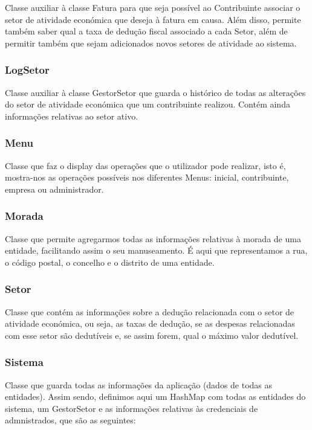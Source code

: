 \documentclass[a4paper]{article}
\begin{document}
Classe auxiliar à classe Fatura para que seja possível ao Contribuinte associar o setor de atividade económica que deseja à fatura em causa. Além disso, permite também saber qual a taxa de dedução fiscal associado a cada Setor, além de permitir também que sejam adicionados novos setores de atividade ao sistema.


\subsubsection{LogSetor} %

Classe auxiliar à classe GestorSetor que guarda o histórico de todas as alterações do setor de atividade económica que um contribuinte realizou. Contém ainda informações relativas ao setor ativo.

 
\subsubsection{Menu} %

Classe que faz o display das operações que o utilizador pode realizar, isto é, mostra-nos as operações possíveis nos diferentes Menus: inicial, contribuinte, empresa ou administrador.


\subsubsection{Morada} %

Classe que permite agregarmos todas as informações relativas à morada de uma entidade, facilitando assim o seu manuseamento. É aqui que representamos a rua, o código postal, o concelho e o distrito de uma entidade.


\subsubsection{Setor} %

Classe que contém as informações sobre a dedução relacionada com o setor de atividade económica, ou seja, as taxas de dedução, se as despesas relacionadas com esse setor são dedutíveis e, se assim forem, qual o máximo valor dedutível.


\subsubsection{Sistema} %

Classe que guarda todas as informações da aplicação (dados de todas as entidades). Assim sendo, definimos aqui um HashMap com todas as entidades do sistema, um GestorSetor e as informações relativas às credenciais de admnistrados, que são as seguintes:
\end{document}
